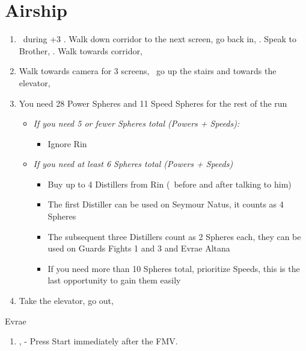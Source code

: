 \chapter{Airship}

\begin{enumerate}
    \item \sd\ during \cs+3 \skippablefmv. Walk down corridor to the next screen, go back in, \sd. Speak to Brother, \sd. Walk towards corridor, \sd
    \item Walk towards camera for 3 screens, \save\, go up the stairs and towards the elevator, \sd
    \winnpsingle
    \item You need 28 Power Spheres and 11 Speed Spheres for the rest of the run
    \begin{itemize}
        \item \textit{If you need 5 or fewer Spheres total (Powers + Speeds):}
        \begin{itemize}
            \item Ignore Rin
        \end{itemize}
        \item \textit{If you need at least 6 Spheres total (Powers + Speeds)}
        \begin{itemize}
            \item Buy up to 4 Distillers from Rin (\sd\ before and after talking to him)
            \item The first Distiller can be used on Seymour Natus, it counts as 4 Spheres
            \item The subsequent three Distillers count as 2 Spheres each, they can be used on Guards Fights 1 and 3 and Evrae Altana
            \item If you need more than 10 Spheres total, prioritize Speeds, this is the last opportunity to gain them easily
        \end{itemize}
    \end{itemize}
    \item Take the elevator, go out, \sd
\end{enumerate}
\begin{battle}[32000]{Evrae}
    \begin{itemize}
    \end{itemize}
\end{battle}
\begin{enumerate}[resume]
    \item \sd, \skippablefmv[3:00] - Press Start immediately after the FMV.
\end{enumerate}
\bothnp\lossnpsingle
